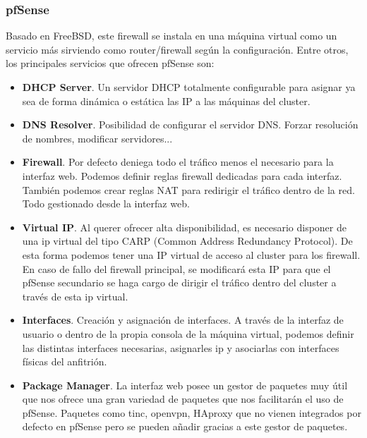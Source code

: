                 \subsubsection{pfSense}
                        \begin{text}
                                Basado en FreeBSD, este firewall se instala en una máquina virtual como un servicio más sirviendo como router/firewall según la configuración. Entre otros, los principales servicios que ofrecen pfSense son:
                                \begin{itemize}
                                        \item \textbf{DHCP Server}. Un servidor DHCP totalmente configurable para asignar ya sea de forma dinámica o estática las IP a las máquinas del cluster.
                                        \item \textbf{DNS Resolver}. Posibilidad de configurar el servidor DNS. Forzar resolución de nombres, modificar servidores...
                                        \item \textbf{Firewall}. Por defecto deniega todo el tráfico menos el necesario para la interfaz web. Podemos definir reglas firewall dedicadas para cada interfaz. También podemos crear reglas NAT para redirigir el tráfico dentro de la red. Todo gestionado desde la interfaz web.
                                        \item \textbf{Virtual IP}. Al querer ofrecer alta disponibilidad, es necesario disponer de una ip virtual del tipo CARP (Common Address Redundancy Protocol). De esta forma podemos tener una IP virtual de acceso al cluster para los firewall. En caso de fallo del firewall principal, se modificará esta IP para que el pfSense secundario se haga cargo de dirigir el tráfico dentro del cluster a través de esta ip virtual.
                                        \item \textbf{Interfaces}. Creación y asignación de interfaces. A través de la interfaz de usuario o dentro de la propia consola de la máquina virtual, podemos definir las distintas interfaces necesarias, asignarles ip y asociarlas con interfaces físicas del anfitrión.
                                        \item \textbf{Package Manager}. La interfaz web posee un gestor de paquetes muy útil que nos ofrece una gran variedad de paquetes que nos facilitarán el uso de pfSense. Paquetes como tinc, openvpn, HAproxy que no vienen integrados por defecto en pfSense pero se pueden añadir gracias a este gestor de paquetes.

\end{itemize}
\end{text}
